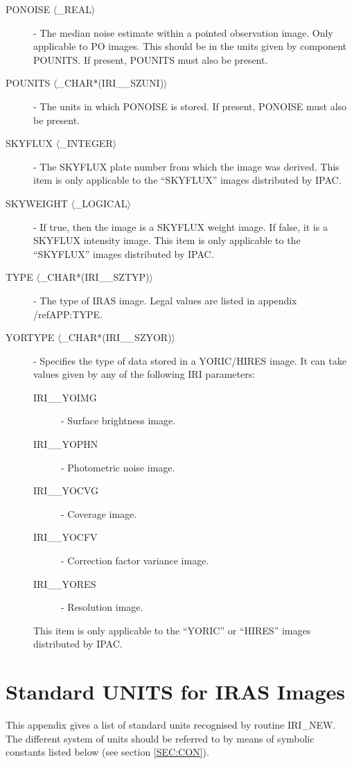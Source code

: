 \begin{description}
\item [PONOISE $\langle$\_REAL$\rangle$] - The median noise estimate within a 
pointed observation image. Only applicable to PO images. This should be in the 
units given by component POUNITS. If present, POUNITS must also be present.

\item [POUNITS $\langle$\_CHAR*(IRI\_\_SZUNI)$\rangle$] - The units in which 
PONOISE is stored. If present, PONOISE must also be present.

\item [SKYFLUX $\langle$\_INTEGER$\rangle$] - The SKYFLUX plate number from which the
image was derived. This item is only applicable to the ``SKYFLUX'' images
distributed by IPAC. 

\item [SKYWEIGHT $\langle$\_LOGICAL$\rangle$] - If true, then the image is a
SKYFLUX weight image. If false, it is a SKYFLUX intensity image. This item is
only applicable to the ``SKYFLUX'' images distributed by IPAC. 

\item [TYPE $\langle$\_CHAR*(IRI\_\_SZTYP)$\rangle$] - The type of IRAS image. 
Legal values are listed in appendix /ref{APP:TYPE}.

\item [YORTYPE $\langle$\_CHAR*(IRI\_\_SZYOR)$\rangle$] - Specifies the type of 
data stored in a YORIC/HIRES image. It can take values given by any of the 
following IRI parameters:
\begin{description}
\item [IRI\_\_YOIMG] - Surface brightness image.
\item [IRI\_\_YOPHN] - Photometric noise image.
\item [IRI\_\_YOCVG] - Coverage image.
\item [IRI\_\_YOCFV] - Correction factor variance image.
\item [IRI\_\_YORES] - Resolution image.
\end{description}
This item is only applicable to the ``YORIC'' or ``HIRES''  images distributed 
by IPAC. 

\end{description}

\section{Standard UNITS for IRAS Images}
\label{APP:UNITS}
This appendix gives a list of standard units recognised by routine IRI\_NEW.
The different system of units should be referred to by means of symbolic 
constants listed below (see section \ref{SEC:CON}).


